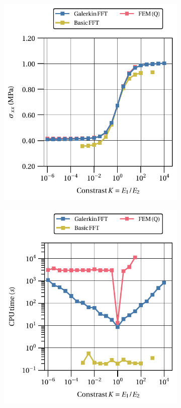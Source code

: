 \begin{figure}[hbt]
  \centering
  	\begin{subfigure}[b]{0.49\textwidth}
      \centering
      \includegraphics[width=\textwidth]{figures/linear_3D_normal_stress_avg_vs_stiff_ratio}
      \caption{}
      \label{subfig:linear_3D_normal_stress_avg_vs_stiff_ratio}
    \end{subfigure}
    \begin{subfigure}[b]{0.49\textwidth}
      \centering
      \includegraphics[width=\textwidth]{figures/linear_3D_normal_stress_avg_cpu_time_vs_n_voxels}

\end{subfigure}
\end{figure}
